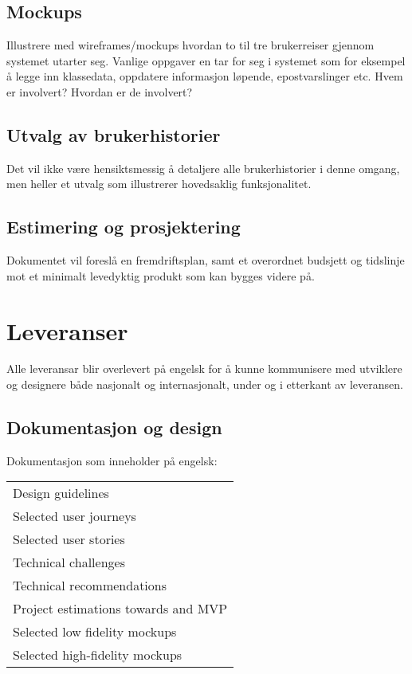 \subsection{Mockups}
Illustrere med wireframes/mockups hvordan to til tre brukerreiser gjennom systemet utarter seg. Vanlige oppgaver en tar for seg i systemet som for eksempel å legge inn klassedata, oppdatere informasjon løpende, epostvarslinger etc. Hvem er involvert? Hvordan er de involvert?

\subsection{Utvalg av brukerhistorier}
Det vil ikke være hensiktsmessig å detaljere alle brukerhistorier i denne omgang, men heller et utvalg som illustrerer hovedsaklig funksjonalitet.

\subsection{Estimering og prosjektering}
Dokumentet vil foreslå en fremdriftsplan, samt et overordnet budsjett og tidslinje mot et minimalt levedyktig produkt som kan bygges videre på.

\section{Leveranser}
Alle leveransar blir overlevert på engelsk for å kunne kommunisere med utviklere og designere både nasjonalt og internasjonalt, under og i etterkant av leveransen.

\subsection{Dokumentasjon og design}
Dokumentasjon som inneholder på engelsk:

\begin{center}
\begin{tabu} to 1.0\textwidth {    X[l]  }
 \hline
Design guidelines \\
Selected user journeys \\
Selected user stories \\
Technical challenges \\
Technical recommendations \\
Project estimations towards and MVP \\
Selected low fidelity mockups \\
Selected high-fidelity mockups \\
 \hline
\end{tabu}
\end{center}


